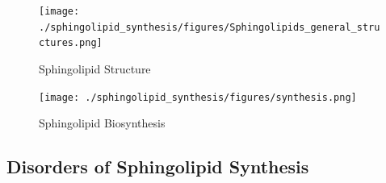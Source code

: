 \documentclass{scrartcl}
\begin{document}
\begin{enumerate}
\begin{enumerate}
\begin{figure}[htbp]
\centering
\texttt{[image: ./sphingolipid\_synthesis/figures/Sphingolipids\_general\_structures.png]}
\caption[Sphingolipid Structure]{\label{fig:org2c68bff}
Sphingolipid Structure}
\end{figure}


\begin{figure}[htbp]
\centering
\texttt{[image: ./sphingolipid\_synthesis/figures/synthesis.png]}
\caption[Sphingolipid Biosynthesis]{\label{fig:org1a74576}
Sphingolipid Biosynthesis}
\end{figure}
\end{enumerate}
\end{enumerate}

\subsection{Disorders of Sphingolipid Synthesis}
\label{sec:orgbae7d11}
\end{document}
